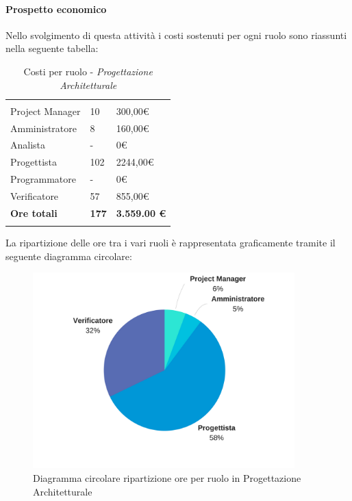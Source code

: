 		\paragraph{Prospetto economico} \Spazio
		Nello svolgimento di questa attività i costi sostenuti per ogni ruolo sono riassunti nella seguente tabella:
		\begin{table}[H]
			\centering
			\begin{tabular}{|p{4cm}|C{4cm}|C{4cm}|}
				
				 & &\\
				Project Manager & 10 & 300,00\euro \\
				\hline
				Amministratore& 8 & 160,00\euro \\
				\hline
				Analista & - & 0\euro \\
				\hline
				Progettista & 102 & 2244,00\euro \\
				\hline
				Programmatore & - & 0\euro \\
				\hline
				Verificatore & 57 & 855,00\euro \\
				\hline
				\textbf{Ore totali} & \textbf{177} & \textbf{3.559.00 \euro} \\
			\end{tabular}
			\caption{Costi per ruolo - \textit{Progettazione Architetturale}}
		\end{table}
		
		La ripartizione delle ore tra i vari ruoli è rappresentata graficamente tramite il seguente diagramma circolare:
		
		\begin{figure}[H] 
			\centering 
			\includegraphics[width=0.9\textwidth]{images/CircolareProgettazioneArchitetturale.png} 
			\caption{Diagramma circolare ripartizione ore per ruolo in Progettazione Architetturale}
			\label{CircolareProgettazioneArchitetturale}
		\end{figure}		
		

